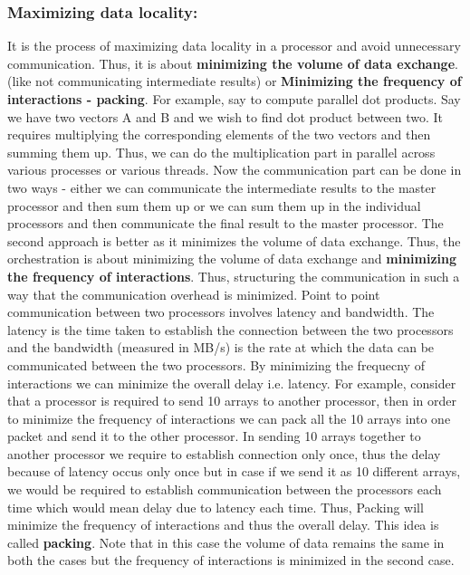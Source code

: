 \documentclass[12pt]{article}
\begin{document}
\subsubsection{Maximizing data locality: }
It is the process of maximizing data locality in a processor and avoid unnecessary communication. Thus, it is about \textbf{minimizing the volume of data exchange}.
(like not communicating intermediate results) or \textbf{Minimizing the frequency of interactions - packing}.
For example, say to compute parallel dot products. Say we have two vectors A and B and we wish to find dot product between two. It requires 
multiplying the corresponding elements of the two vectors and then summing them up. Thus, we can do the multiplication part in parallel across various processes or various threads.
Now the communication part can be done in two ways - either we can communicate the intermediate results to the master processor and then sum them up or we can sum them up in the individual processors and then communicate the final result to the master processor.
The second approach is better as it minimizes the volume of data exchange. Thus, the orchestration is about minimizing the volume of data exchange and \textbf{minimizing the frequency of interactions}. Thus, structuring the communication in such a way that the communication overhead is minimized.
Point to point communication between two processors involves latency and bandwidth. The latency is the time taken to establish the connection between the two processors and the bandwidth (measured in MB/s) is the rate at which the data can be communicated between the two processors. By minimizing the frequecny of interactions we can minimize the overall delay i.e. latency.
For example, consider that a processor is required to send 10 arrays to another processor, then in order to minimize the frequency of interactions 
we can pack all the 10 arrays into one packet and send it to the other processor. In sending 10 arrays together to another processor we require to establish connection only once, thus the delay because of latency
occus only once but in case if we send it as 10 different arrays, we would be required to establish communication between the processors each time which would mean delay due to latency each time. 
Thus, Packing will minimize the frequency of interactions and thus the overall delay. This idea is called 
\textbf{packing}. Note that in this case the volume of data remains the same in both the cases 
but the frequency of interactions is minimized in the second case.
\end{document}
